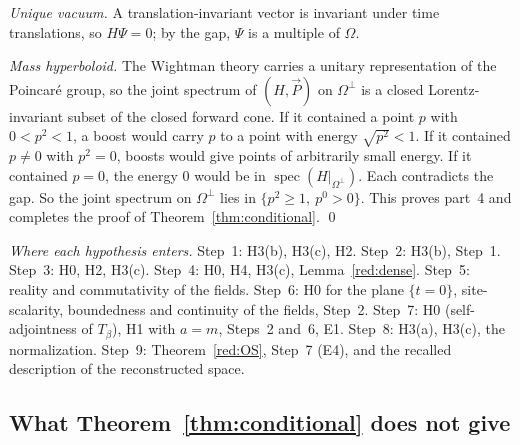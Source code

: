 \emph{Unique vacuum.} A translation-invariant vector is invariant under time translations, so $H\Psi=0$; by the gap, $\Psi$ is a multiple of $\Omega$.

\emph{Mass hyperboloid.} The Wightman theory carries a unitary representation of the Poincar\'e group, so the joint spectrum of $(H,\vec P)$ on $\Omega^\perp$ is a closed Lorentz-invariant subset of the closed forward cone. If it contained a point $p$ with $0<p^2<1$, a boost would carry $p$ to a point with energy $\sqrt{p^2}<1$. If it contained $p\ne0$ with $p^2=0$, boosts would give points of arbitrarily small energy. If it contained $p=0$, the energy $0$ would be in $\operatorname{spec}(H|_{\Omega^\perp})$. Each contradicts the gap. So the joint spectrum on $\Omega^\perp$ lies in $\{p^2\ge1,\ p^0>0\}$. This proves part~4 and completes the proof of Theorem~\ref{thm:conditional}. \qed

\emph{Where each hypothesis enters.} Step~1: H3(b), H3(c), H2. Step~2: H3(b), Step~1. Step~3: H0, H2, H3(c). Step~4: H0, H4, H3(c), Lemma~\ref{red:dense}. Step~5: reality and commutativity of the fields. Step~6: H0 for the plane $\{t=0\}$, site-scalarity, boundedness and continuity of the fields, Step~2. Step~7: H0 (self-adjointness of $T_\beta$), H1 with $a=m$, Steps~2 and~6, E1. Step~8: H3(a), H3(c), the normalization. Step~9: Theorem~\ref{red:OS}, Step~7 (E4), and the recalled description of the reconstructed space.

\subsection{What Theorem~\ref{thm:conditional} does not give}\label{red:not}

